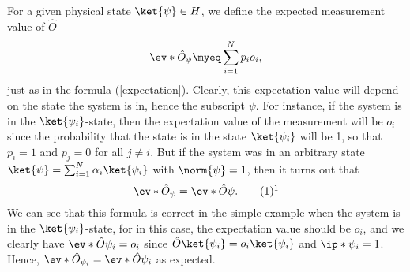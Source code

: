 For a given physical state $\ket{\psi}\in H$, we define the expected measurement value of $\hat{O}$
\begin{equation}\label{expectation2}
\ev*{\hat{O}}_\psi\myeq\sum_{i=1}^N p_io_i,
\end{equation}
just as in the formula (\ref{expectation}). Clearly, this expectation value will depend on the state the system is in, hence the subscript $\psi$. For instance, if the system is in the $\ket{\psi_i}$-state, then the expectation value of the measurement will be $o_i$ since the probability that the state is in the state $\ket{\psi_i}$ will be 1, so that $p_i=1$ and $p_j=0$ for all $j\neq i$. But if the system was in an arbitrary state $\ket{\psi}=\sum_{i=1}^N \alpha_i\ket{\psi_i}$ with $\norm{\psi}=1$, then it turns out that 
\begin{equation}\refstepcounter{equation}\label{evev}\ev*{\hat{O}}_\psi=\ev*{\hat{O}}{\psi}.\tag{\theequation}\protect\footnotemark
\end{equation}We can see that this formula is correct in the simple example when the system is in the $\ket{\psi_i}$-state, for in this case, the expectation value should be $o_i$, and we clearly have $\ev*{\hat{O}}{\psi_i}=o_i$ since $\hat{O}\ket{\psi_i}=o_i\ket{\psi_i}$ and $\ip*{\psi_i}=1$. Hence, $\ev*{\hat{O}}_{\psi_i}=\ev*{\hat{O}}{\psi_i}$ as expected.

